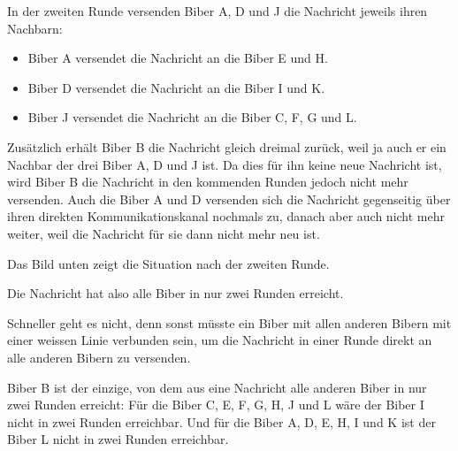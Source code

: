 {{{\centering%
\par}

In der zweiten Runde versenden Biber A, D und J die Nachricht jeweils ihren Nachbarn:

\begin{itemize}
  \item Biber A versendet die Nachricht an die Biber E und H.
  \item Biber D versendet die Nachricht an die Biber I und K.
  \item Biber J versendet die Nachricht an die Biber C, F, G und L.
\end{itemize}

Zusätzlich erhält Biber B die Nachricht gleich dreimal zurück, weil ja auch er ein Nachbar der drei Biber A, D und J ist. Da dies für ihn keine neue Nachricht ist, wird Biber B die Nachricht in den kommenden Runden jedoch nicht mehr versenden. Auch die Biber A und D versenden sich die Nachricht gegenseitig über ihren direkten Kommunikationskanal nochmals zu, danach aber auch nicht mehr weiter, weil die Nachricht für sie dann nicht mehr neu ist.

\begin{samepage}
Das Bild unten zeigt die Situation nach der zweiten Runde.

\nopagebreak

{\centering%
\par}
\end{samepage}

Die Nachricht hat also alle Biber in nur zwei Runden erreicht.

Schneller geht es nicht, denn sonst müsste ein Biber mit allen anderen Bibern mit einer weissen Linie verbunden sein, um die Nachricht in einer Runde direkt an alle anderen Bibern zu versenden.

Biber B ist der einzige, von dem aus eine Nachricht alle anderen Biber in nur zwei Runden erreicht: Für die Biber C, E, F, G, H, J und L wäre der Biber I nicht in zwei Runden erreichbar. Und für die Biber A, D, E, H, I und K ist der Biber L nicht in zwei Runden erreichbar.



}}
